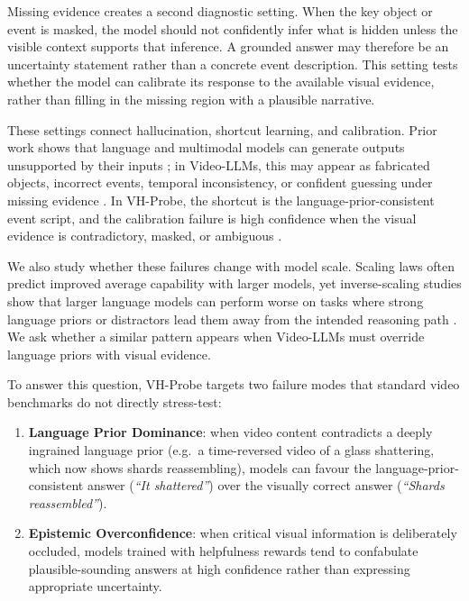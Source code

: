 \documentclass[final,5p,times,twocolumn]{elsarticle}
\begin{document}
Missing evidence creates a second diagnostic setting. When the key object or
event is masked, the model should not confidently infer what is hidden unless
the visible context supports that inference. A grounded answer may therefore be
an uncertainty statement rather than a concrete event description. This setting
tests whether the model can calibrate its response to the available visual
evidence, rather than filling in the missing region with a plausible narrative.

These settings connect hallucination, shortcut learning, and calibration. Prior
work shows that language and multimodal models can generate outputs unsupported
by their inputs \cite{ji2023survey,rawte2023survey,bai2024hallucination}; in
Video-LLMs, this may appear as fabricated objects, incorrect events, temporal
inconsistency, or confident guessing under missing evidence
\cite{li2023evaluating,wang2024videohallucer,li2025vidhalluc,choong2024vidhal}.
In VH-Probe, the shortcut is the language-prior-consistent event script, and
the calibration failure is high confidence when the visual evidence is
contradictory, masked, or ambiguous
\cite{geirhos2020shortcut,guo2017calibration,ovadia2019can}.

We also study whether these failures change with model scale. Scaling laws
often predict improved average capability with larger models, yet
inverse-scaling studies show that larger language models can perform worse on
tasks where strong language priors or distractors lead them away from the
intended
reasoning path \cite{mckenzie2023inverse,wei2023inverse,shi2023large}. We ask
whether a similar pattern appears when Video-LLMs must override language priors
with visual evidence.

To answer this question, VH-Probe targets two failure modes that standard video
benchmarks do not directly stress-test:

\begin{enumerate}
  \item \textbf{Language Prior Dominance}: when video content
  contradicts a deeply ingrained language prior
  (e.g.\ a time-reversed video of a glass shattering, which now shows
  shards reassembling), models can favour the language-prior-consistent answer
  (\textit{``It shattered''}) over the visually correct answer
  (\textit{``Shards reassembled''}).
  \item \textbf{Epistemic Overconfidence}: when critical visual
  information is deliberately occluded, models trained with helpfulness
  rewards tend to confabulate plausible-sounding answers at high
  confidence rather than expressing appropriate uncertainty.
\end{enumerate}
\end{document}
